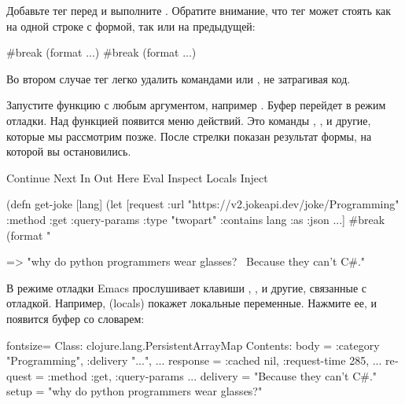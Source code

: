 Добавьте тег  перед  и выполните . Обратите внимание, что тег может стоять как на одной строке с формой, так или на предыдущей:

\begin{english}
\begin{clojure}
#break (format ...)     #break
                        (format ...)
  \end{clojure}
\end{english}

Во втором случае тег легко удалить командами  или , не затрагивая код.

Запустите функцию с любым аргументом, например . Буфер перейдет в режим отладки. Над функцией появится меню действий. Это команды , ,  и другие, которые мы рассмотрим позже. После стрелки \code{=>} показан результат формы, на которой вы остановились.

\begin{english}
  \begin{clojure}
Continue Next In Out Here Eval Inspect Locals Inject

(defn get-joke [lang]
  (let [request
        {:url "https://v2.jokeapi.dev/joke/Programming"
         :method :get
         :query-params {:type "twopart" :contains lang}
         :as :json}
        ...]
    #break
    (format "%

 => "why do python programmers wear glasses? \
     Because they can't C#."
  \end{clojure}
\end{english}

В режиме отладки Emacs прослушивает клавиши , ,  и другие, связанные с отладкой. Например,  (locals) покажет локальные переменные. Нажмите ее, и появится буфер со словарем:

\begin{english}
  \begin{clojure*}{fontsize=\small}
Class: clojure.lang.PersistentArrayMap
Contents:
  body = { :category "Programming", :delivery "...",  ... }
  response = { :cached nil, :request-time 285,  ... }
  request = { :method :get, :query-params ... }
  delivery = "Because they can't C#."
  setup = "why do python programmers wear glasses?"
  \end{clojure*}
\end{english}

